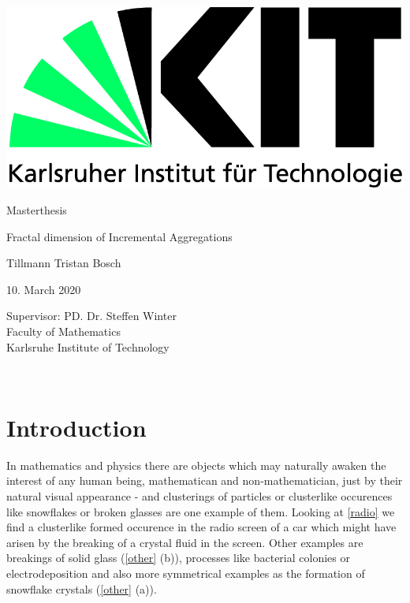 \documentclass[12pt,a4paper]{scrartcl}
\numberwithin{equation}{subsection}
\newcommand{\1}{\mathbbm{1}}
\numberwithin{equation}{section}
\theoremstyle{definition}
\begin{document}
	\pagestyle{empty}

\begin{titlepage}

	\includegraphics[scale=0.45]{images/kit-logo.jpg} 
    \vspace*{2cm} 
\begin{center} \large 
    
   Masterthesis
    \vspace*{2cm}

    {\huge Fractal dimension of Incremental Aggregations}\\
    \vspace*{2.5cm}

    Tillmann Tristan Bosch
    \vspace*{1.5cm}

    10. March 2020
    \vspace*{3.5cm}


    Supervisor: PD. Dr. Steffen Winter \\[1cm]
    Faculty of Mathematics\\[1cm]
	Karlsruhe Institute of Technology
\end{center}
\end{titlepage}

\newpage

\newpage
\phantom \\
\newpage

\tableofcontents %

 	\pagestyle{headings}

\setcounter{page}{1}


\newpage

\section{Introduction}
	In mathematics and physics there are objects which may naturally awaken the interest of any human being, mathematican and non-mathematician, just by their natural visual appearance - and clusterings of particles or clusterlike occurences like snowflakes or broken glasses are one example of them. Looking at \autoref{radio} we find a clusterlike formed occurence in the radio screen of a car which might have arisen by the breaking of a crystal fluid in the screen. Other examples are breakings of solid glass (\autoref{other} (b)), processes like bacterial colonies or electrodeposition and also more symmetrical examples as the formation of snowflake crystals (\autoref{other} (a)). \\
	
\end{document}
